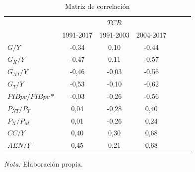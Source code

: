 \documentclass[12pt,letterpaper]{article}
\begin{document}
\begin{table}
\caption{Matriz de correlación}
\begin{center}
\begin{tabular}{lcccccc}									

\hline													
\hline
							& 	\multicolumn{3}{c}{$TCR$}\\
	&	1991-2017	&	1991-2003	&	2004-2017	\\
\hline							
$G/Y$	&	-0,34	&	0,10	&	-0,44	\\
$G_{K}/Y$	&	-0,47	&	0,11	&	-0,57	\\
$G_{NT}/Y$	&	-0,46	&	-0,03	&	-0,56	\\
$G_{T}/Y$	&	-0,53	&	-0,10	&	-0,62	\\
$PIBpc/PIBpc*$	&	-0,03	&	-0,26	&	-0,56	\\
$P_{NT}/P_T$	&	0,04	&	-0,28	&	0,40	\\
$P_X/P_M$	&	0,01	&	-0,26	&	0,24	\\
$CC/Y$	&	0,40	&	0,30	&	0,68	\\
$AEN/Y$	&	0,45	&	0,21	&	0,68	\\
\hline													
\hline									
\end{tabular}	
\end{center}						
\begin{scriptsize}
\emph{Nota:} Elaboración propia.
\end{scriptsize}	
\label{correbeer}	
\end{table}						
\end{document}
